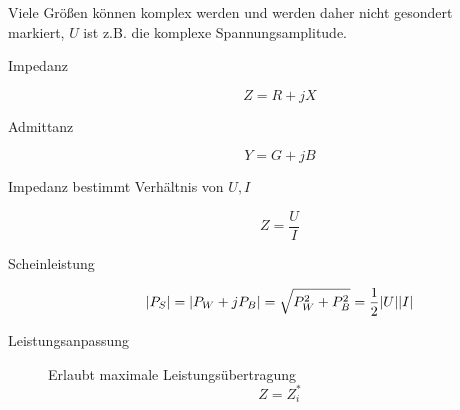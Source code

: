 Viele Größen können komplex werden und werden daher nicht gesondert markiert, $U$ ist z.B. die komplexe Spannungsamplitude.
\begin{description}
\item[Impedanz]
\begin{equation*}
Z = R + jX
\end{equation*}

\item[Admittanz]
\begin{equation*}
Y = G + jB
\end{equation*}

\item[Impedanz bestimmt Verhältnis von $U,I$]
\begin{equation*}
Z = \frac{U}{I}
\end{equation*}

\item[Scheinleistung]
\begin{equation*}
|P_S| = \left\vert P_W + j P_B \right\vert = \sqrt{P_W^2 + P_B^2} = \frac{1}{2} |U||I|\\
\end{equation*}

\item[Leistungsanpassung] Erlaubt maximale Leistungsübertragung
\begin{equation*}
Z = Z^*_i
\end{equation*}
\end{description}